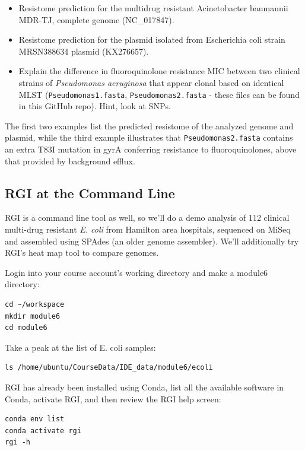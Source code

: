 \documentclass[
]{book}
\providecommand{\tightlist}{%
  \setlength{\itemsep}{0pt}\setlength{\parskip}{0pt}}
\begin{document}
\begin{itemize}
\tightlist
\item
  Resistome prediction for the multidrug resistant Acinetobacter baumannii MDR-TJ, complete genome (NC\_017847).
\item
  Resistome prediction for the plasmid isolated from Escherichia coli strain MRSN388634 plasmid (KX276657).
\item
  Explain the difference in fluoroquinolone resistance MIC between two clinical strains of \emph{Pseudomonas aeruginosa} that appear clonal based on identical MLST (\texttt{Pseudomonas1.fasta}, \texttt{Pseudomonas2.fasta} - these files can be found in this GitHub repo). Hint, look at SNPs.
\end{itemize}

The first two examples list the predicted resistome of the analyzed genome and plasmid, while the third example illustrates that \texttt{Pseudomonas2.fasta} contains an extra T83I mutation in gyrA conferring resistance to fluoroquinolones, above that provided by background efflux.

\subsection{RGI at the Command Line}\label{rgi-at-the-command-line}

RGI is a command line tool as well, so we'll do a demo analysis of 112 clinical multi-drug resistant \emph{E. coli} from Hamilton area hospitals, sequenced on MiSeq and assembled using SPAdes (an older genome assembler). We'll additionally try RGI's heat map tool to compare genomes.

Login into your course account's working directory and make a module6 directory:

\begin{verbatim}
cd ~/workspace
mkdir module6
cd module6
\end{verbatim}

Take a peak at the list of E. coli samples:

\begin{verbatim}
ls /home/ubuntu/CourseData/IDE_data/module6/ecoli
\end{verbatim}

RGI has already been installed using Conda, list all the available software in Conda, activate RGI, and then review the RGI help screen:

\begin{verbatim}
conda env list
conda activate rgi
rgi -h
\end{verbatim}
\end{document}
